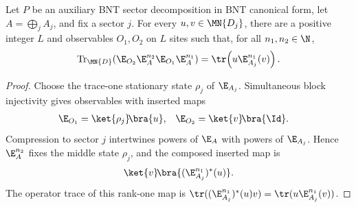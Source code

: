 \begin{lemma}
    \label{lem:positive_gap_bnt_rank_one_probe_expectation}
    \leanok
    Let $P$ be an auxiliary BNT sector decomposition in BNT canonical form, let
    $A=\bigoplus_j A_j$, and fix a sector $j$. For every
    $u,v\in\MN{D_j}$, there are a positive integer $L$ and observables
    $O_1,O_2$ on $L$ sites such that, for all $n_1,n_2\in\N$,
    \begin{align}
        \operatorname{Tr}_{\MN{D}}\!\left(
        \E_{O_2}\E_A^{n_2}\E_{O_1}\E_A^{n_1}\right)
        =\tr\!\left(u\E_{A_j}^{n_1}(v)\right).
        \notag
    \end{align}
\end{lemma}
\begin{proof}\leanok
    Choose the trace-one stationary state $\rho_j$ of $\E_{A_j}$. Simultaneous
    block injectivity gives observables with inserted maps
    \begin{align}
        \E_{O_1} & =\ket{\rho_j}\!\bra{u},
                 &
        \E_{O_2} & =\ket{v}\!\bra{\Id}.
        \notag
    \end{align}
    Compression to sector $j$ intertwines powers of $\E_A$ with powers of
    $\E_{A_j}$. Hence $\E_A^{n_2}$ fixes the middle state $\rho_j$, and the
    composed inserted map is
    \begin{align}
        \ket{v}\!\bra{(\E_{A_j}^{n_1})^*(u)}.
        \notag
    \end{align}
    The operator trace of this rank-one map is
    $\tr((\E_{A_j}^{n_1})^*(u)v)
        =\tr(u\E_{A_j}^{n_1}(v))$.
\end{proof}

